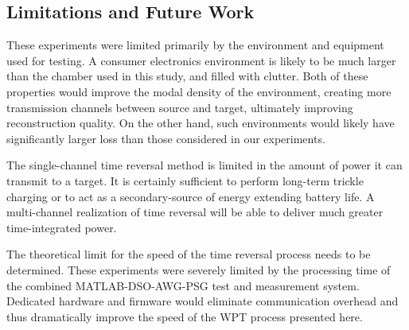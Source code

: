 \subsection{Limitations and Future Work}
\label{sec:limitations}


These experiments were limited primarily by the environment and equipment used
for testing.
%
A consumer electronics environment is likely to be much larger than the chamber
used in this study, and filled with clutter.
%
Both of these properties would improve the modal density of the environment,
creating more transmission channels between source and target, ultimately
improving reconstruction quality.
%
On the other hand, such environments would likely have significantly larger loss
than those considered in our experiments.






The single-channel time reversal method is limited in the amount of power it can
transmit to a target.
%
It is certainly sufficient to perform long-term trickle charging or to act as a
secondary-source of energy extending battery life.
%
A multi-channel realization of time reversal will be able to deliver much
greater time-integrated power.



The theoretical limit for the speed of the time reversal process needs to be
determined.
%
These experiments were severely limited by the processing time of the combined
MATLAB-DSO-AWG-PSG test and measurement system.
%
Dedicated hardware and firmware would eliminate communication overhead and thus
dramatically improve the speed of the WPT process presented here.
